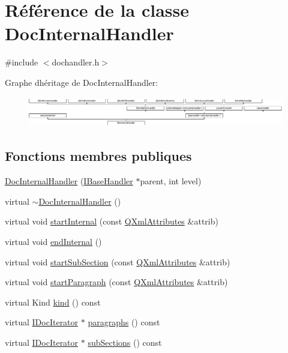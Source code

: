 \hypertarget{class_doc_internal_handler}{}\section{Référence de la classe Doc\+Internal\+Handler}
\label{class_doc_internal_handler}


{\ttfamily \#include $<$dochandler.\+h$>$}

Graphe d\textquotesingle{}héritage de Doc\+Internal\+Handler\+:\begin{figure}[H]
\begin{center}
\leavevmode
\includegraphics[height=1.322314cm]{class_doc_internal_handler}
\end{center}
\end{figure}
\subsection*{Fonctions membres publiques}
\begin{DoxyCompactItemize}
\item 
\hyperlink{class_doc_internal_handler_a427a5ae98fdbbca2c01cd591b8ef0cf4}{Doc\+Internal\+Handler} (\hyperlink{class_i_base_handler}{I\+Base\+Handler} $\ast$parent, int level)
\item 
virtual \hyperlink{class_doc_internal_handler_a129ee61a546aaae4020605d74714972a}{$\sim$\+Doc\+Internal\+Handler} ()
\item 
virtual void \hyperlink{class_doc_internal_handler_af41ed4390babd870c4e111544226284c}{start\+Internal} (const \hyperlink{class_q_xml_attributes}{Q\+Xml\+Attributes} \&attrib)
\item 
virtual void \hyperlink{class_doc_internal_handler_aaff500a74479fff6bbbd398b90d69e69}{end\+Internal} ()
\item 
virtual void \hyperlink{class_doc_internal_handler_af51a9a54d3d5d53100648239f08aa013}{start\+Sub\+Section} (const \hyperlink{class_q_xml_attributes}{Q\+Xml\+Attributes} \&attrib)
\item 
virtual void \hyperlink{class_doc_internal_handler_a7ed05a39b8e15ed7c73bf9b4d7070146}{start\+Paragraph} (const \hyperlink{class_q_xml_attributes}{Q\+Xml\+Attributes} \&attrib)
\item 
virtual Kind \hyperlink{class_doc_internal_handler_ab450fce0ec63a8d1d047db6a6c63dc2f}{kind} () const 
\item 
virtual \hyperlink{class_i_doc_iterator}{I\+Doc\+Iterator} $\ast$ \hyperlink{class_doc_internal_handler_a6a14fe9c0821a89570f586739ca3e99c}{paragraphs} () const 
\item 
virtual \hyperlink{class_i_doc_iterator}{I\+Doc\+Iterator} $\ast$ \hyperlink{class_doc_internal_handler_abdd253137e116defe238e50a5e122630}{sub\+Sections} () const 
\end{DoxyCompactItemize}
